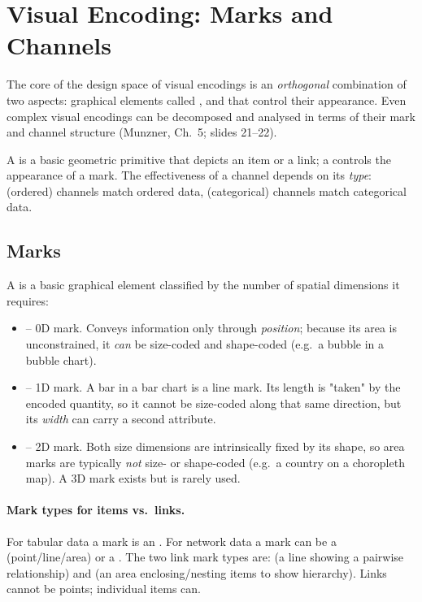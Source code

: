 \section{Visual Encoding: Marks and Channels}

The core of the design space of visual encodings is an \emph{orthogonal}
combination of two aspects: graphical elements called , and
 that control their appearance. Even complex visual
encodings can be decomposed and analysed in terms of their mark and channel
structure (Munzner, Ch.~5; slides 21--22).

\begin{keybox}
A  is a basic geometric primitive that depicts an item or a link;
a  controls the appearance of a mark. The effectiveness of a
channel depends on its \emph{type}:  (ordered) channels match
ordered data,  (categorical) channels match categorical data.
\end{keybox}

\subsection{Marks}

A  is a basic graphical element classified by the number of spatial
dimensions it requires:
\begin{itemize}
  \item {} -- 0D mark. Conveys information only through \emph{position};
        because its area is unconstrained, it \emph{can} be size-coded and
        shape-coded (e.g.\ a bubble in a bubble chart).
  \item {} -- 1D mark. A bar in a bar chart is a line mark. Its length
        is "taken" by the encoded quantity, so it cannot be size-coded along that
        same direction, but its \emph{width} can carry a second attribute.
  \item {} -- 2D mark. Both size dimensions are intrinsically fixed by
        its shape, so area marks are typically \emph{not} size- or shape-coded
        (e.g.\ a country on a choropleth map). A 3D  mark exists
        but is rarely used.
\end{itemize}

\paragraph{Mark types for items vs.\ links.} For tabular data a mark is an
. For network data a mark can be a  (point/line/area) or a
. The two link mark types are:  (a line showing a
pairwise relationship) and  (an area enclosing/nesting items
to show hierarchy). Links cannot be points; individual items can.

